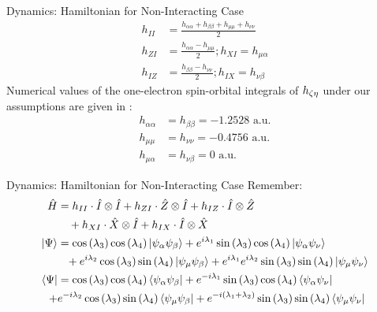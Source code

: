 \documentclass[professionalfonts]{beamer}
\newcommand{\bra}[1]{\ensuremath{\left\langle#1\right\vert}}
\newcommand{\ket}[1]{\ensuremath{\left|#1\right\rangle}}
\newcommand{\s}[1]{\sin\left( #1 \right)}
\newcommand{\co}[1]{\cos\left( #1 \right)}
\newcommand{\uo}[1]{
		\IfEqCase{#1}{
			{0}{\mu}
			{1}{\nu}
			{2}{\xi}
		}[\PackageError{uo}{Undefined option to uo: #1}{}]
}
\newcommand{\oo}[1]{
		\IfEqCase{#1}{
			{0}{\alpha}
			{1}{\beta}
			{2}{\gamma}
		}[\PackageError{unocorb}{Undefined option to unuo: #1}{}]
}
\newcommand{\go}[1]{
		\IfEqCase{#1}{
			{0}{\zeta}
			{1}{\eta}
			{2}{\iota}
			{3}{\kappa}
		}[\PackageError{unocorb}{Undefined option to go: #1}{}]
}
\begin{document}
\begin{frame}{Dynamics: Hamiltonian for Non-Interacting Case}
%
\begin{equation*}
	\begin{split}
			h_{II}
		&=	\frac{h_{\alpha\alpha} + h_{\beta\beta} + h_{\mu\mu} + h_{\nu\nu}} 2
%
	\\
%
			h_{ZI}
		&=	\frac{h_{\alpha\alpha} - h_{\mu\mu}} 2
%
	;
%
			h_{XI}
		= 	h_{\mu\alpha}
%
	\\
%
			h_{IZ}
		&=	\frac{h_{\beta\beta} - h_{\nu\nu}} 2
%
	;
%
			h_{IX}
		=	h_{\nu\beta}
	\end{split}
\end{equation*}
Numerical values of the one-electron spin-orbital integrals of $h_{\go 0 \go 1}$ under our assumptions are given in \citep{szabo}:
%
\begin{equation*}
	\begin{split}
		h_{\alpha\alpha} &= h_{\beta\beta} = -1.2528 \text{ a.u.} \\
		h_{\mu\mu} &= h_{\nu\nu} = -0.4756 \text{ a.u.}\\
		h_{\mu\alpha} &= h_{\nu\beta} = 0 \text{ a.u.}
	\end{split}
\end{equation*}
\end{frame}


\begin{frame}{Dynamics: Hamiltonian for Non-Interacting Case}
%
	Remember:
%
\begin{equation*}
	\begin{split}
	\hat H 
		 &=	h_{II} \cdot \hat I \otimes \hat I
		+	h_{ZI} \cdot \hat Z \otimes \hat I
		+	h_{IZ} \cdot \hat I \otimes \hat Z
	\\
		& \quad 
		+	h_{XI} \cdot \hat X \otimes \hat I
		+	h_{IX} \cdot \hat I \otimes \hat X
%
%
	\\
%
%
	\ket \Psi 
	&= 
	\co {\lambda_3}\co {\lambda_4}\ket {\psi_{\oo 0}\psi_{\oo 1}}
	+ e^{i\lambda_1}\s {\lambda_3}\co {\lambda_4}\ket{\psi_{\oo 0} \psi_{\uo 1}} 
	\\
	&\phantom{=}
	+ e^{i\lambda_2}\co {\lambda_3 }\s {\lambda_4}\ket {\psi_{\uo 0}\psi_{\oo 1}} 
	+ e^{i\lambda_1}e^{i\lambda_2}\s {\lambda_3}\s {\lambda_4}\ket{\psi_{\uo 0} \psi_{\uo 1}} 
%
	\\
%
	\bra \Psi 
	&= 
	\co {\lambda_3}\co {\lambda_4}\bra {\psi_{\oo 0}\psi_{\oo 1}}
	+ e^{-i\lambda_1}\s {\lambda_3}\co {\lambda_4}\bra{\psi_{\oo 0} \psi_{\uo 1}} 
	\\
		+& e^{-i\lambda_2}\co {\lambda_3 }\s {\lambda_4}\bra {\psi_{\uo 0}\psi_{\oo 1}} 
	+ e^{-i(\lambda_1 +\lambda_2)}\s {\lambda_3}\s {\lambda_4}\bra{\psi_{\uo 0} \psi_{\uo 1}} 
	\end{split}
\end{equation*}
\end{frame}
\end{document}
